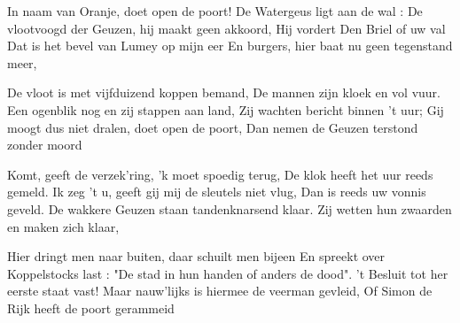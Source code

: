 \footnotemark [
ititle={Lied van Koppelstock, het}]


\beginverse
In naam van Oranje, doet open de poort!
De Watergeus ligt aan de wal :
De vlootvoogd der Geuzen, hij maakt geen akkoord,
Hij vordert Den Briel of uw val
Dat is het bevel van Lumey op mijn eer
En burgers, hier baat nu geen tegenstand meer,
\endverse

\beginverse
De vloot is met vijfduizend koppen bemand,
De mannen zijn kloek en vol vuur.
Een ogenblik nog en zij stappen aan land,
Zij wachten bericht binnen 't uur;
Gij moogt dus niet dralen, doet open de poort,
Dan nemen de Geuzen terstond zonder moord
\endverse

\beginverse
Komt, geeft de verzek'ring, 'k moet spoedig terug,
De klok heeft het uur reeds gemeld.
Ik zeg 't u, geeft gij mij de sleutels niet vlug,
Dan is reeds uw vonnis geveld.
De wakkere Geuzen staan tandenknarsend klaar.
Zij wetten hun zwaarden en maken zich klaar,
\endverse

\beginverse
Hier dringt men naar buiten, daar schuilt men bijeen
En spreekt over Koppelstocks last :
"De stad in hun handen of anders de dood".
't Besluit tot her eerste staat vast!
Maar nauw'lijks is hiermee de veerman gevleid,
Of Simon de Rijk heeft de poort gerammeid
\endverse
\endsong